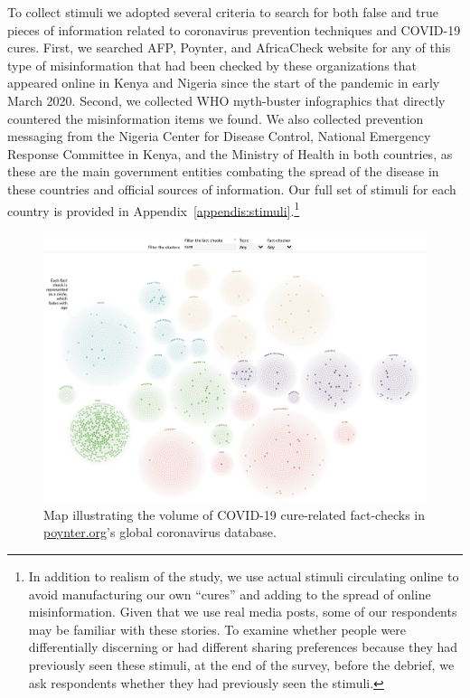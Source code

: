 \documentclass[letterpaper, 12pt, parskip=full,]{scrartcl}
\begin{document}
To collect stimuli we adopted several criteria to search for both false and true pieces of information related to coronavirus prevention techniques and COVID-19 cures. First, we searched AFP, Poynter, and AfricaCheck website for any of this type of misinformation that had been checked by these organizations that appeared online in Kenya and Nigeria since the start of the pandemic in early March 2020. Second, we collected WHO myth-buster infographics that directly countered the misinformation items we found. We also collected prevention messaging from the Nigeria Center for Disease Control, National Emergency Response Committee in Kenya, and the Ministry of Health in both countries, as these are the main government entities combating the spread of the disease in these countries and official sources of information. Our full set of stimuli for each country is provided in Appendix~\ref{appendis:stimuli}.\footnote{In addition to realism of the study, we use actual stimuli circulating online to avoid manufacturing our own ``cures'' and adding to the spread of online misinformation. Given that we use real media posts, some of our respondents may be familiar with these stories. To examine whether people were differentially discerning \citep{nyhan2020facts} or had different sharing preferences because they had previously seen these stimuli, at the end of the survey, before the debrief, we ask respondents whether they had previously seen the stimuli.}





\begin{figure}[t]
\centering
\caption{Map illustrating the volume of COVID-19 cure-related fact-checks in \url{poynter.org}'s global coronavirus database.}
\label{fig:poynter_cures}
\includegraphics[width=.95\textwidth]{poynter_cures.png} 
\end{figure}
\end{document}
